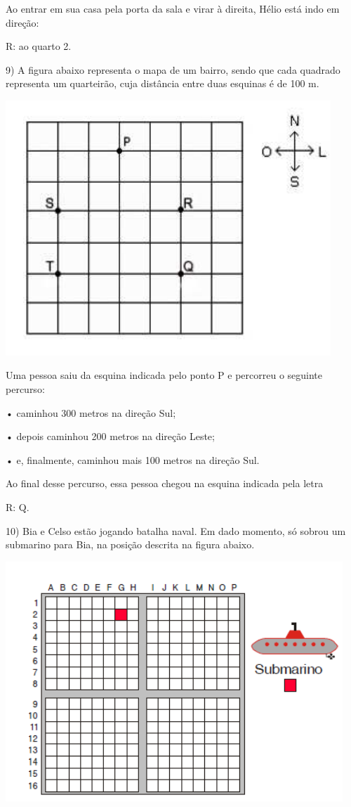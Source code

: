 Ao entrar em sua casa pela porta da sala e virar à direita, Hélio está
indo em direção:

R: ao quarto 2.

9) A figura abaixo representa o mapa de um bairro, sendo que cada
quadrado representa um quarteirão, cuja distância entre duas esquinas é
de 100 m.

\includegraphics[width=4.82569in,height=3.77917in]{./imgSAEB_6_MAT/media/image72.png}

Uma pessoa saiu da esquina indicada pelo ponto P e percorreu o seguinte
percurso:

• caminhou 300 metros na direção Sul;

• depois caminhou 200 metros na direção Leste;

• e, finalmente, caminhou mais 100 metros na direção Sul.

Ao final desse percurso, essa pessoa chegou na esquina indicada pela
letra

R: Q.

10) Bia e Celso estão jogando batalha naval. Em dado momento, só sobrou
um submarino para Bia, na posição descrita na figura abaixo.

\includegraphics[width=5in,height=3.55208in]{./imgSAEB_6_MAT/media/image73.png}

